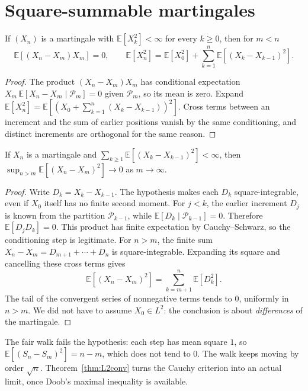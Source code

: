 \section{Square-summable martingales}

\begin{proposition}\label{prop:orthinc}
If $(X_n)$ is a martingale with $\mathbb E[X_k^2]<\infty$ for every $k\ge0$, then for $m<n$
\[
 \mathbb E[(X_n-X_m)X_m]=0,
 \qquad
 \mathbb E[X_n^2]=\mathbb E[X_0^2]+\sum_{k=1}^n\mathbb E[(X_k-X_{k-1})^2].
\]
\end{proposition}
\begin{proof}
The product $(X_n-X_m)X_m$ has conditional expectation $X_m\,\mathbb E[X_n-X_m\mid\mathcal P_m]=0$ given $\mathcal P_m$, so its mean is zero. Expand $\mathbb E[X_n^2]=\mathbb E[(X_0+\sum_{k=1}^n(X_k-X_{k-1}))^2]$. Cross terms between an increment and the sum of earlier positions vanish by the same conditioning, and distinct increments are orthogonal for the same reason.
\end{proof}

\begin{proposition}\label{prop:l2cauchy}
If $X_n$ is a martingale and $\sum_{k\ge1}\mathbb E[(X_k-X_{k-1})^2]<\infty$, then $\sup_{n>m}\mathbb E[(X_n-X_m)^2]\to0$ as $m\to\infty$.
\end{proposition}
\begin{proof}
Write $D_k=X_k-X_{k-1}$. The hypothesis makes each $D_k$ square-integrable, even if $X_0$ itself has no finite second moment. For $j<k$, the earlier increment $D_j$ is known from the partition $\mathcal P_{k-1}$, while
$\mathbb E[D_k\mid\mathcal P_{k-1}]=0$. Therefore $\mathbb E[D_jD_k]=0$. This product has finite expectation by Cauchy--Schwarz, so the conditioning step is legitimate.
For $n>m$, the finite sum $X_n-X_m=D_{m+1}+\cdots+D_n$ is square-integrable. Expanding its square and cancelling these cross terms gives
\[
 \mathbb E[(X_n-X_m)^2]=\sum_{k=m+1}^n\mathbb E[D_k^2].
\]
The tail of the convergent series of nonnegative terms tends to $0$, uniformly in $n>m$. We did not have to assume $X_0\in L^2$: the conclusion is about \emph{differences} of the martingale.
\end{proof}

The fair walk fails the hypothesis: each step has mean square $1$, so $\mathbb E[(S_n-S_m)^2]=n-m$, which does not tend to $0$. The walk keeps moving by order $\sqrt n$. Theorem~\ref{thm:L2conv} turns the Cauchy criterion into an actual limit, once Doob's maximal inequality is available.


